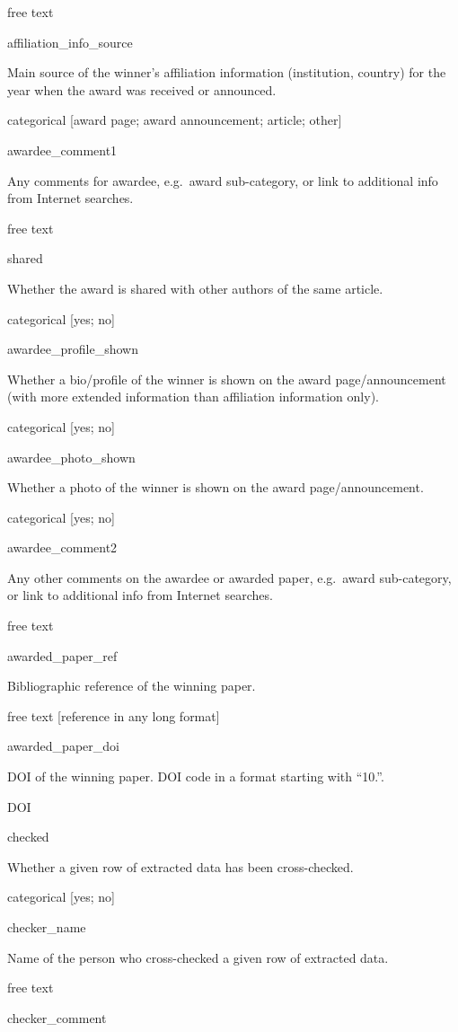 \documentclass[
]{article}
\begin{document}
free text

affiliation\_info\_source

Main source of the winner's affiliation information (institution,
country) for the year when the award was received or announced.

categorical {[}award page; award announcement; article; other{]}

awardee\_comment1

Any comments for awardee, e.g.~award sub-category, or link to additional
info from Internet searches.

free text

shared

Whether the award is shared with other authors of the same article.

categorical {[}yes; no{]}

awardee\_profile\_shown

Whether a bio/profile of the winner is shown on the award
page/announcement (with more extended information than affiliation
information only).

categorical {[}yes; no{]}

awardee\_photo\_shown

Whether a photo of the winner is shown on the award page/announcement.

categorical {[}yes; no{]}

awardee\_comment2

Any other comments on the awardee or awarded paper, e.g.~award
sub-category, or link to additional info from Internet searches.

free text

awarded\_paper\_ref

Bibliographic reference of the winning paper.

free text {[}reference in any long format{]}

awarded\_paper\_doi

DOI of the winning paper. DOI code in a format starting with ``10.''.

DOI

checked

Whether a given row of extracted data has been cross-checked.

categorical {[}yes; no{]}

checker\_name

Name of the person who cross-checked a given row of extracted data.

free text

checker\_comment
\end{document}
